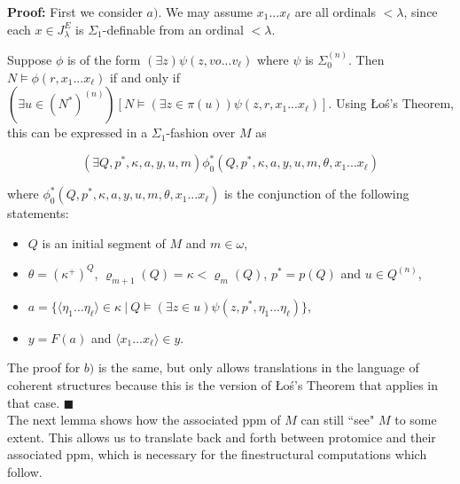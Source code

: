\documentclass[12pt]{article}
\begin{document}
\indent \indent \textbf{Proof:}  First we consider $a)$.  We may assume $x_1 ... x_\ell$ are all ordinals $< \lambda$, since each $x \in J_\lambda^E$ is $\Sigma_1$-definable from an ordinal $< \lambda$.  

Suppose $\phi$ is of the form $(\exists z) \psi (z , vo ... v_\ell )$ where $\psi$ is $\Sigma_0^{(n)}$.  Then $N \models \phi (r, x_1 ... x_\ell )$ if and only if $(\exists u \in (N^*)^{(n)} ) [ N \models ( \exists z \in \pi (u) ) \psi ( z , r , x_1 ... x_\ell ) ]$.  Using {\L}o{\'s}'s Theorem, this can be expressed in a $\Sigma_1$-fashion over $M$ as

\[
( \exists Q , p^* , \kappa , a , y , u , m) \phi_0^* (Q , p^* , \kappa , a , y , u , m , \theta , x_1 ... x_\ell )
\]

where $\phi_0^* (Q , p^* , \kappa , a , y , u , m , \theta , x_1 ... x_\ell )$ is the conjunction of the following statements:\\

\begin{itemize}
\item{ $Q$ is an initial segment of $M$ and $m \in \omega$,}
\item{ $\theta = (\kappa^+)^Q$, $\varrho_{m+1} (Q) = \kappa < \varrho_m (Q)$, $p^* = p (Q)$ and $u \in Q^{(n)}$,}
\item{ $a = \{ \langle \eta_1 ... \eta_\ell \rangle \in \kappa \ | \ Q \models (\exists z \in u ) \psi (z , p^* , \eta_1 ... \eta_\ell ) \}$,}
\item{ $y = F(a)$ and $\langle x_1 ... x_\ell \rangle \in y$.}
\end{itemize}


 
 \bigskip

The proof for $b)$ is the same, but only allows translations in the language of coherent structures because this is the version of {\L}o{\'s}'s Theorem that applies in that case. $\blacksquare$\\

The next lemma shows how the associated ppm of $M$ can still ``see" $M$ to some extent.  This allows us to translate back and forth between protomice and their associated ppm, which is necessary for the finestructural computations which follow.\\
\end{document}
